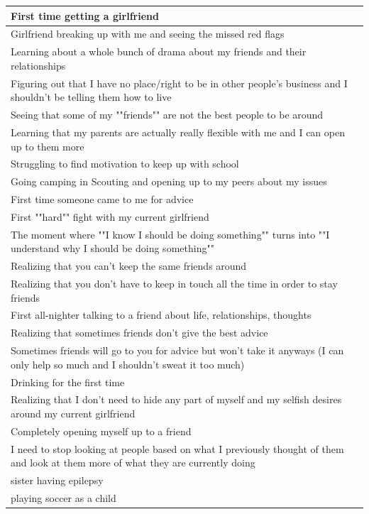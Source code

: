\documentclass[
  .7em,
  letterpaper,
  DIV=11,
  numbers=noendperiod]{scrartcl}
\begin{document}
\begin{table}
\begin{tabular}{l}
\hline
First time getting a girlfriend\\
\hline
Girlfriend breaking up with me and seeing the missed red flags\\
\hline
Learning about a whole bunch of drama about my friends and their relationships\\
\hline
Figuring out that I have no place/right to be in other people's business and I shouldn't be telling them how to live\\
\hline
Seeing that some of my ""friends"" are not the best people to be around\\
\hline
Learning that my parents are actually really flexible with me and I can open up to them more\\
\hline
Struggling to find motivation to keep up with school\\
\hline
Going camping in Scouting and opening up to my peers about my issues\\
\hline
First time someone came to me for advice\\
\hline
First ""hard"" fight with my current girlfriend\\
\hline
The moment where ""I know I should be doing something"" turns into ""I understand why I should be doing something""\\
\hline
Realizing that you can't keep the same friends around\\
\hline
Realizing that you don't have to keep in touch all the time in order to stay friends\\
\hline
First all-nighter talking to a friend about life, relationships, thoughts\\
\hline
Realizing that sometimes friends don't give the best advice\\
\hline
Sometimes friends will go to you for advice but won't take it anyways (I can only help so much and I shouldn't sweat it too much)\\
\hline
Drinking for the first time\\
\hline
Realizing that I don't need to hide any part of myself and my selfish desires around my current girlfriend\\
\hline
Completely opening myself up to a friend\\
\hline
I need to stop looking at people based on what I previously thought of them and look at them more of what they are currently doing\\
\hline
sister having epilepsy\\
\hline
playing soccer as a child\\

\end{tabular}
\end{table}
\end{document}
